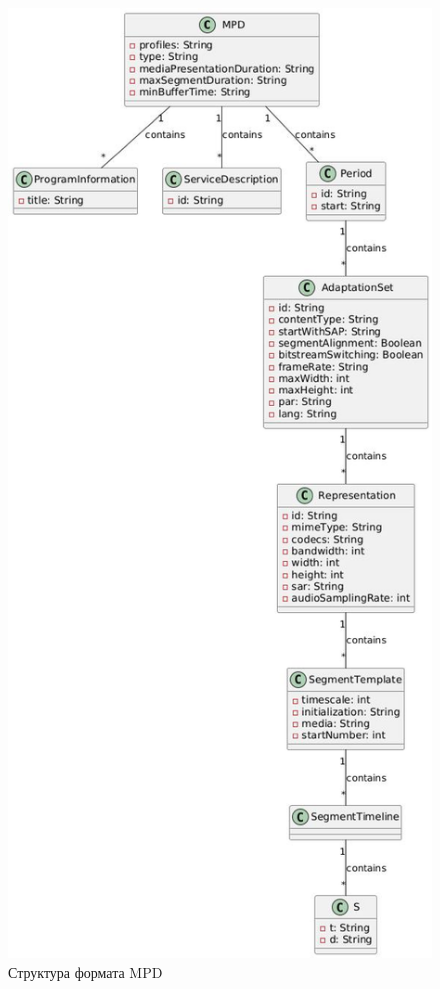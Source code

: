 	\begin{figure}[ht!] 
		\center
		\includegraphics [scale=0.5] {my_folder/images//mpd_format}
		\caption{Структура формата MPD \cite{rfcRtp}}
		\label{fig:mpd_format}  
	\end{figure}

